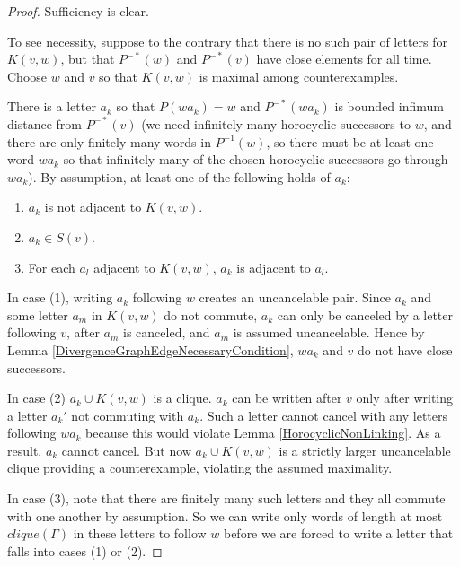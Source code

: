 \documentclass[10pt,a4paper]{amsart}
\theoremstyle{definition}
\theoremstyle{remark}
\begin{document}
	\begin{proof}
		
		Sufficiency is clear.
		
		To see necessity, suppose to the contrary that there is no such pair of letters for $K(v,w)$, but that $P^{-*}(w)$ and $P^{-*}(v)$ have close elements for all time. Choose $w$ and $v$ so that $K(v,w)$ is maximal among counterexamples.
		
		There is a letter $a_k$ so that $P(wa_k)=w$ and $P^{-*}(wa_k)$ is bounded infimum distance from $P^{-*}(v)$ (we need infinitely many horocyclic successors to $w$, and there are only finitely many words in $P^{-1}(w)$, so there must be at least one word $wa_k$ so that infinitely many of the chosen horocyclic successors go through $wa_k$). By assumption, at least one of the following holds of $a_k$: 
		
		\begin{enumerate}
			
			\item $a_k$ is not adjacent to $K(v,w)$.
			
			\item $a_k\in S(v)$.
			
			\item For each $a_l$ adjacent to $K(v,w)$, $a_k$ is adjacent to $a_l$.
			
		\end{enumerate}
		
		In case (1), writing $a_k$ following $w$ creates an uncancelable pair. Since $a_k$ and some letter $a_m$ in $K(v,w)$ do not commute, $a_k$ can only be canceled by a letter following $v$, after $a_m$ is canceled, and $a_m$ is assumed uncancelable. Hence by Lemma \ref{DivergenceGraphEdgeNecessaryCondition}, $wa_k$ and $v$ do not have close successors.
		
		In case (2) $a_k\cup K(v,w)$ is a clique. $a_k$ can be written after $v$ only after writing a letter $a_k'$ not commuting with $a_k$. Such a letter cannot cancel with any letters following $wa_k$ because this would violate Lemma \ref{HorocyclicNonLinking}. As a result, $a_k$ cannot cancel. But now $a_k\cup K(v,w)$ is a strictly larger uncancelable clique providing a counterexample, violating the assumed maximality.
		
		In case (3), note that there are finitely many such letters and they all commute with one another by assumption. So we can write only words of length at most $clique(\Gamma)$ in these letters to follow $w$ before we are forced to write a letter that falls into cases (1) or (2).
	\end{proof}
	
\end{document}
